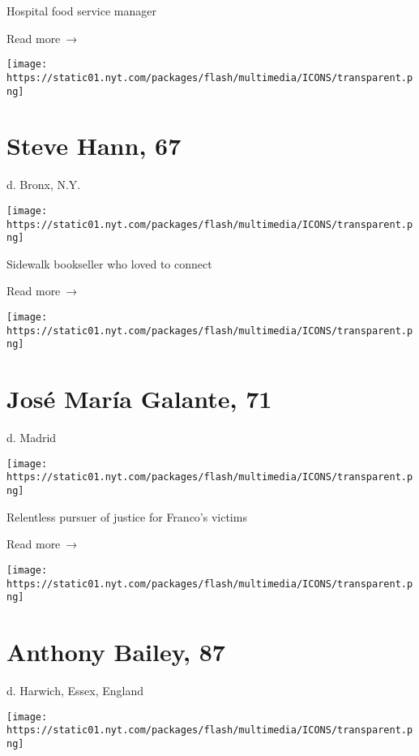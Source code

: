 Hospital food service manager

 Read more~→

\href{https://www.nytimes.com/2020/05/27/obituaries/steve-hann-dead-coronavirus.html}{}

\texttt{[image: https://static01.nyt.com/packages/flash/multimedia/ICONS/transparent.png]}

\hypertarget{steve-hann-67}{%
\section{Steve Hann, 67}\label{steve-hann-67}}

d. Bronx, N.Y.

\texttt{[image: https://static01.nyt.com/packages/flash/multimedia/ICONS/transparent.png]}

Sidewalk bookseller who loved to connect

 Read more~→

\href{https://www.nytimes.com/2020/05/27/obituaries/jose-maria-galante-dead-coronavirus.html}{}

\texttt{[image: https://static01.nyt.com/packages/flash/multimedia/ICONS/transparent.png]}

\hypertarget{josuxe9-maruxeda-galante-71}{%
\section{José María Galante, 71}\label{josuxe9-maruxeda-galante-71}}

d. Madrid

\texttt{[image: https://static01.nyt.com/packages/flash/multimedia/ICONS/transparent.png]}

Relentless pursuer of justice for Franco's victims

 Read more~→

\href{https://www.nytimes.com/2020/05/26/books/anthony-bailey-dead-coronavirus.html}{}

\texttt{[image: https://static01.nyt.com/packages/flash/multimedia/ICONS/transparent.png]}

\hypertarget{anthony-bailey-87}{%
\section{Anthony Bailey, 87}\label{anthony-bailey-87}}

d. Harwich, Essex, England

\texttt{[image: https://static01.nyt.com/packages/flash/multimedia/ICONS/transparent.png]}

